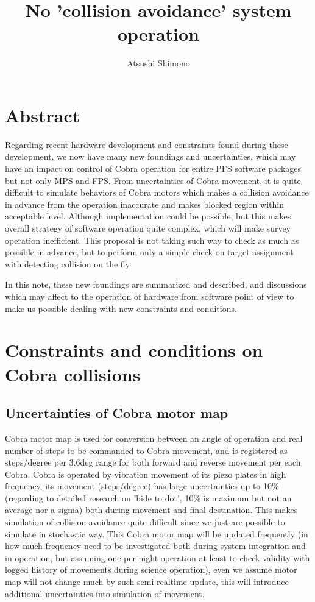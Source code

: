 \documentclass[a4paper,notitlepage]{article}
\title{No 'collision avoidance' system operation}
\author{Atsushi Shimono}
\begin{document}
\drafttrue
{}
\SSNChangeRecord{
}

\ssnhead

\section{Abstract}

Regarding recent hardware development and constraints found during these 
development, we now have many new foundings and uncertainties, which may 
have an impact on control of Cobra operation for entire PFS software 
packages but not only MPS and FPS.
From uncertainties of Cobra movement, it is quite difficult to simulate 
behaviors of Cobra motors which makes a collision avoidance in advance from 
the operation inaccurate and makes blocked region within acceptable level. 
Although implementation could be possible, but this makes overall strategy 
of software operation quite complex, which will make survey operation 
inefficient. 
This proposal is not taking such way to check as much as possible in advance, 
but to perform only a simple check on target assignment with detecting 
collision on the fly. 

In this note, these new foundings are summarized and described, and 
discussions which may affect to the operation of hardware from software 
point of view to make us possible dealing with new constraints and conditions. 

\section{Constraints and conditions on Cobra collisions}

\subsection{Uncertainties of Cobra motor map}

Cobra motor map is used for conversion between an angle of operation and 
real number of steps to be commanded to Cobra movement, and is registered 
as steps/degree per 3.6deg range for both forward and reverse movement per 
each Cobra. Cobra is operated by vibration movement of its piezo plates in 
high frequency, its movement (steps/degree) has large uncertainties up to 
10\% (regarding to detailed research on 'hide to dot', 10\% is maximum but 
not an average nor a sigma) both during movement and final destination. 
This makes simulation of collision avoidance quite difficult since we just 
are possible to simulate in stochastic way. 
This Cobra motor map will be updated frequently (in how much frequency need 
to be investigated both during system integration and in operation, but 
assuming one per night operation at least to check validity with logged 
history of movements during science operation), even we assume motor map 
will not change much by such semi-realtime update, this will introduce 
additional uncertainties into simulation of movement. 
\end{document}

